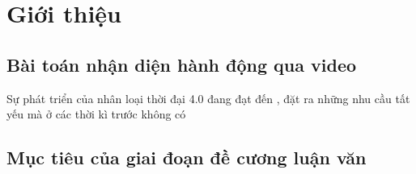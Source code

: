 \section{Giới thiệu}
\subsection{Bài toán nhận diện hành động qua video}
Sự phát triển của nhân loại thời đại 4.0 đang đạt đến , đặt ra những nhu cầu tất yếu mà ở các thời kì trước không có


\subsection{Mục tiêu của giai đoạn đề cương luận văn}
